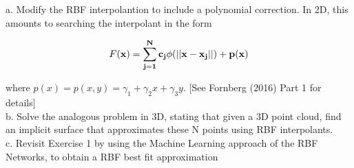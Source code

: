 a. Modify the RBF interpolantion to include a polynomial correction. In 2D, this amounts to searching
the interpolant in the form

$$F(\bf{x}) = \sum_{j=1}^Nc_j\phi(||\bf{x}-\bf{x}_j||) + p(\bf{x})$$

where $p(x) = p(x, y) = \gamma_1 + \gamma_2x + \gamma_3y$. [See Fornberg (2016) Part 1 for details]\\

b. Solve the analogous problem in 3D, stating that given a 3D point cloud, find an implicit surface
that approximates these N points using RBF interpolants.\\

c. Revisit Exercise 1 by using the Machine Learning approach of the RBF Networks, to obtain a RBF best
fit approximation\\\\

